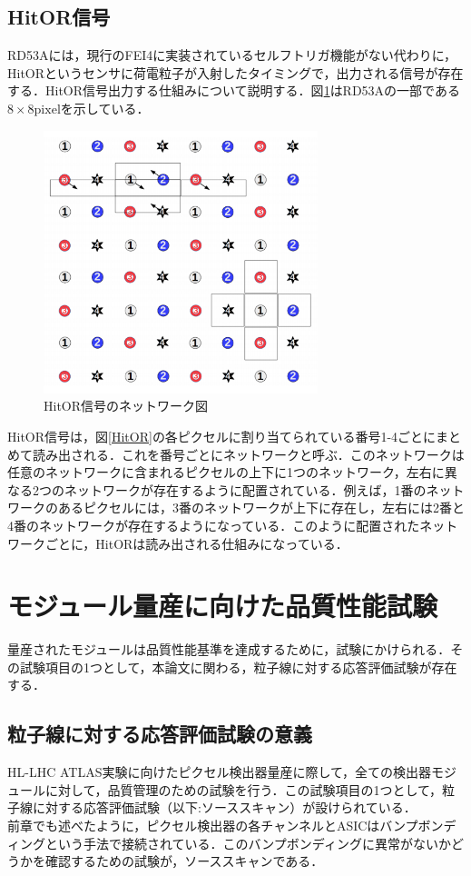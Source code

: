 \subsection{HitOR信号}
RD53Aには，現行のFEI4に実装されているセルフトリガ機能がない代わりに，HitORというセンサに荷電粒子が入射したタイミングで，出力される信号が存在する．HitOR信号出力する仕組みについて説明する．図\ref{fig:HitOR}はRD53Aの一部である$8 \times 8 \mathrm{pixel}$を示している．

\begin{figure}[h]
\centering
\includegraphics[width=8cm]{./figure/HitOR.png}
\caption{HitOR信号のネットワーク図}
\label{fig:HitOR}
\end{figure}

HitOR信号は，図\ref{HitOR}の各ピクセルに割り当てられている番号1-4ごとにまとめて読み出される．これを番号ごとにネットワークと呼ぶ．このネットワークは任意のネットワークに含まれるピクセルの上下に1つのネットワーク，左右に異なる2つのネットワークが存在するように配置されている．例えば，1番のネットワークのあるピクセルには，3番のネットワークが上下に存在し，左右には2番と4番のネットワークが存在するようになっている．このように配置されたネットワークごとに，HitORは読み出される仕組みになっている．

\section{モジュール量産に向けた品質性能試験}
量産されたモジュールは品質性能基準を達成するために，試験にかけられる．その試験項目の1つとして，本論文に関わる，粒子線に対する応答評価試験が存在する．

\subsection{粒子線に対する応答評価試験の意義}
HL-LHC ATLAS実験に向けたピクセル検出器量産に際して，全ての検出器モジュールに対して，品質管理のための試験を行う．この試験項目の1つとして，粒子線に対する応答評価試験（以下:ソーススキャン）が設けられている．\\
前章でも述べたように，ピクセル検出器の各チャンネルとASICはバンプボンディングという手法で接続されている．このバンプボンディングに異常がないかどうかを確認するための試験が，ソーススキャンである．\\

